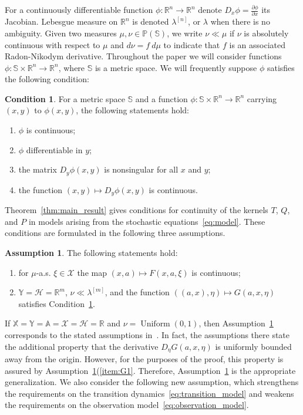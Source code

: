 \documentclass[11pt,onecolumn]{IEEEtran}  %
\newcommand{\Ab}{\mathbb{A}}
\newcommand{\Pb}{\mathbb{P}}
\newcommand{\Rb}{\mathbb{R}}
\newcommand{\Sb}{\mathbb{S}}
\newcommand{\Xb}{\mathbb{X}}
\newcommand{\Yb}{\mathbb{Y}}
\newcommand{\Xc}{\mathcal{X}}
\newcommand{\Hc}{\mathcal{H}}
\DeclareMathOperator{\Uniform}{\mathrm{Uniform}}
\theoremstyle{definition}
\newtheorem{assumption}{Assumption}
\newtheorem{condition}{Condition}
\begin{document}
For a continuously differentiable function $\phi : \Rb^n \to \Rb^n$ denote $D_x \phi = \frac{\partial \phi}{\partial x}$ its Jacobian. Lebesgue measure on $\Rb^n$ is denoted $\lambda^{[n]}$, or $\lambda$ when there is no ambiguity.  Given two measures $\mu, \nu \in \Pb(\Sb)$, we write $\nu \ll \mu$ if $\nu$ is absolutely continuous with respect to $\mu$ and $d\nu = f \ d\mu$ to indicate that $f$ is an associated Radon-Nikodym derivative. Throughout the paper we will consider functions $\phi : \Sb \times \Rb^n \to \Rb^n$, where $\Sb$ is a metric space. We will frequently suppose $\phi$ satisfies the following condition:
\begin{condition} \label{cond:standard_assumption}
    For a metric space $\Sb$ and a function $\phi : \Sb \times \Rb^n \to \Rb^n$ carrying $(x,y)$ to $\phi(x,y)$, the following statements hold:
    \begin{enumerate}
        \item $\phi$ is continuous;
        \item $\phi$  differentiable in $y$;
        \item the matrix $D_y \phi(x,y)$ is nonsingular for all $x$ and $y$;
        \item the function $(x, y) \mapsto D_y \phi(x,y)$ is continuous.
    \end{enumerate}
\end{condition}

Theorem~\ref{thm:main_result} gives conditions for continuity of the kernels $T$,
$Q$, and $P$ in models arising from the stochastic equations~\eqref{eq:model}. These conditions are formulated in the following three assumptions.
\begin{assumption} \label{ass:transition_observation_1}
    The following statements hold:
    \begin{enumerate}[label=\alph*)]
        \item \label{item:F1} for $\mu$-a.s. $\xi \in \Xc$ the map $(x,a) \mapsto F(x,a,\xi)$ is continuous;
        \item \label{item:G1} $\Yb=\Hc=\Rb^m$, $\nu \ll \lambda^{[m]}$, and the function $((a,x),\eta) \mapsto G(a,x,\eta)$ satisfies Condition~\ref{cond:standard_assumption}.
    \end{enumerate}
\end{assumption}

If $\Xb = \Yb = \Ab = \Xc = \Hc = \Rb$ and $\nu = \Uniform(0,1)$, then  Assumption~\ref{ass:transition_observation_1} corresponds to the stated assumptions in~\citet[Section 8.1]{feinberg_partially_2016}. In fact, the assumptions there state the additional property that the derivative $D_\eta G(a,x,\eta)$ is uniformly bounded away from the origin. However, for the purposes of the proof, this property is assured by Assumption~\ref{ass:transition_observation_1}(\ref{item:G1}. Therefore, Assumption~\ref{ass:transition_observation_1} is the appropriate generalization. We also consider the following new assumption, which strengthens the requirements on the transition dynamics~\eqref{eq:transition_model} and weakens the requirements on the observation model~\eqref{eq:observation_model}.
\end{document}
